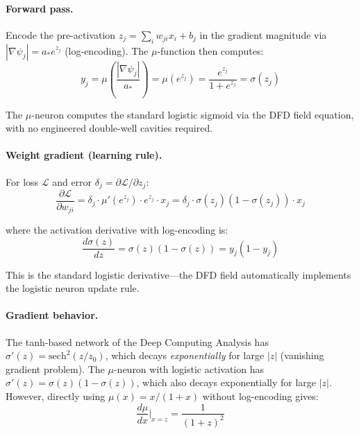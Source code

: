 \documentclass[11pt]{article}
\theoremstyle{definition}
\theoremstyle{remark}
\begin{document}
\paragraph{Forward pass.}
Encode the pre-activation $z_j = \sum_i w_{ji} x_i + b_j$ in the
gradient magnitude via $|\nabla\psi_j| = a_* e^{z_j}$ (log-encoding).
The $\mu$-function then computes:
\begin{equation}
y_j = \mu\!\left(\frac{|\nabla\psi_j|}{a_*}\right)
= \mu(e^{z_j}) = \frac{e^{z_j}}{1 + e^{z_j}} = \sigma(z_j)
\label{eq:mu_neuron_forward}
\end{equation}

The $\mu$-neuron computes the standard logistic sigmoid via the DFD
field equation, with no engineered double-well cavities required.

\paragraph{Weight gradient (learning rule).}
For loss $\mathcal{L}$ and error $\delta_j = \partial\mathcal{L}/\partial z_j$:
\begin{equation}
\frac{\partial\mathcal{L}}{\partial w_{ji}}
= \delta_j \cdot \mu'(e^{z_j}) \cdot e^{z_j} \cdot x_j
= \delta_j \cdot \sigma(z_j)(1 - \sigma(z_j)) \cdot x_j
\label{eq:mu_gradient}
\end{equation}

where the activation derivative with log-encoding is:
\begin{equation}
\frac{d\sigma(z)}{dz} = \sigma(z)(1-\sigma(z)) = y_j(1-y_j)
\end{equation}

This is the standard logistic derivative---the DFD field automatically
implements the logistic neuron update rule.

\paragraph{Gradient behavior.}
The tanh-based network of the Deep Computing Analysis has $\sigma'(z) =
\mathrm{sech}^2(z/z_0)$, which decays \emph{exponentially} for large $|z|$
(vanishing gradient problem). The $\mu$-neuron with logistic activation
has $\sigma'(z) = \sigma(z)(1-\sigma(z))$, which also decays exponentially
for large $|z|$. However, directly using $\mu(x) = x/(1+x)$ without
log-encoding gives:
\begin{equation}
\frac{d\mu}{dx}\bigg|_{x = z} = \frac{1}{(1+z)^2}
\label{eq:mu_direct_deriv}
\end{equation}
\end{document}
